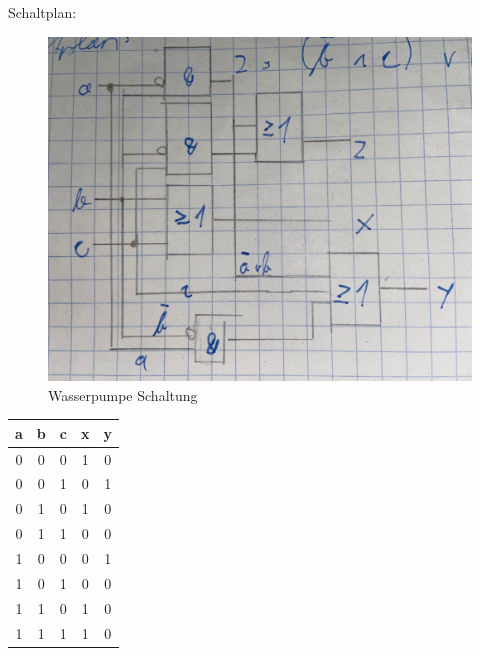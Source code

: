 Schaltplan: \\
%		
%				
%				
%		
%		
%
%
%		
%		
%		
%		

\begin{figure}[H]
	\centering
	\includegraphics[width=0.8\linewidth]{figures/wasserschaltung.jpeg}
	\caption{Wasserpumpe Schaltung}
\end{figure}

\begin{tabular}{c|c|c||c|c}
	a & b & c & x & y \\
	\hline
	0 & 0 & 0 & 1 & 0 \\
	0 & 0 & 1 & 0 & 1 \\
	0 & 1 & 0 & 1 & 0 \\
	0 & 1 & 1 & 0 & 0 \\
	1 & 0 & 0 & 0 & 1 \\
	1 & 0 & 1 & 0 & 0 \\
	1 & 1 & 0 & 1 & 0 \\
	1 & 1 & 1 & 1 & 0 \\
\end{tabular}

